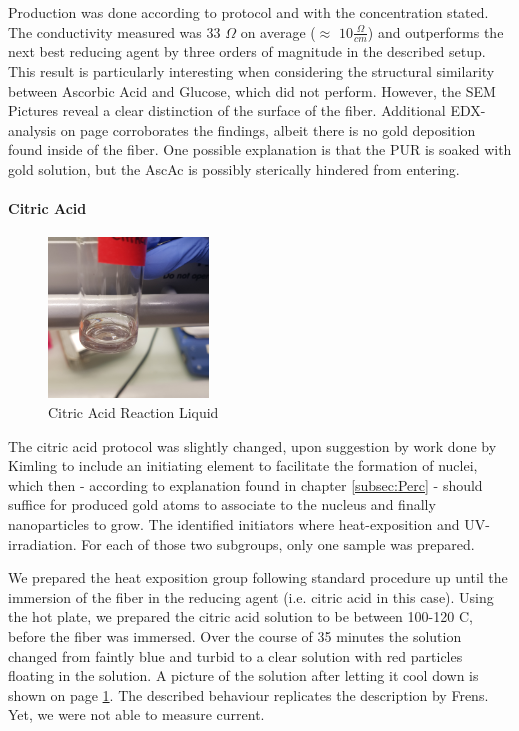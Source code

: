 Production was done according to protocol and with the concentration stated. The conductivity measured was 33 $\Omega$ on average ($\approx$ $10\frac{\Omega}{cm}$) and outperforms the next best reducing agent by three orders of magnitude in the described setup. This result is particularly interesting when considering the structural similarity between Ascorbic Acid and Glucose, which did not perform. However, the SEM Pictures reveal a clear distinction of the surface of the fiber. Additional EDX-analysis on page \pageref{SEMAppendix} corroborates the findings, albeit there is no gold deposition found inside of the fiber. One possible explanation is that the PUR is soaked with gold solution, but the AscAc is possibly sterically hindered from entering. 


\paragraph{Citric Acid}

\begin{figure}
	\begin{center}
		\includegraphics[width=0.38\textwidth]{./pic/CitricAcidViol.jpg}
	\end{center}
	\caption{\label{CitrcAcFibre} Citric Acid Reaction Liquid}	
\end{figure}


The citric acid protocol was slightly changed, upon suggestion by work done by Kimling \cite{Kimling} to include an initiating element to facilitate the formation of nuclei, which then - according to explanation found in chapter \ref{subsec:Perc} - should suffice for produced gold atoms to associate to the nucleus and finally nanoparticles to grow. The identified initiators where heat-exposition and UV-irradiation. For each of those two subgroups, only one sample was prepared.

We prepared the heat exposition group following standard procedure up until the immersion of the fiber in the reducing agent (i.e. citric acid in this case). Using the hot plate, we prepared the citric acid solution to be between 100-120 \degree C, before the fiber was immersed. Over the course of 35 minutes the solution changed from faintly blue and turbid to a clear solution with red particles floating in the solution. A picture of the solution after letting it cool down is shown on page \ref{CitrcAcFibre}. The described behaviour replicates the description by Frens\cite{Frens}. Yet, we were not able to measure current.

